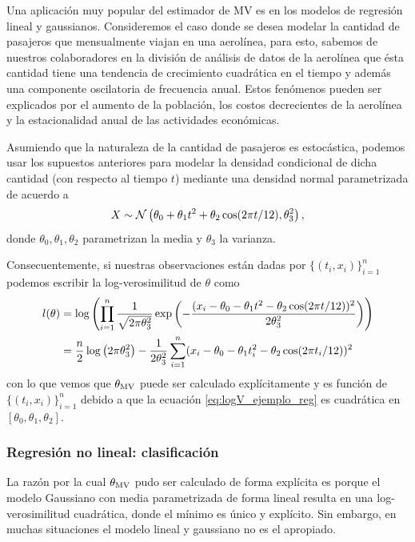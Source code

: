 Una aplicación muy popular del estimador de MV es en los modelos de regresión lineal y gaussianos. Consideremos el caso donde se desea modelar la cantidad de pasajeros que mensualmente viajan en una aerolínea, para esto, sabemos de nuestros colaboradores en la división de análisis de datos de la aerolínea que ésta cantidad tiene una tendencia de crecimiento cuadrática en el tiempo y además una componente oscilatoria de frecuencia anual. Estos fenómenos pueden ser explicados por el aumento de la población, los costos decrecientes de la aerolínea y la estacionalidad anual de las actividades económicas. 

Asumiendo que la naturaleza de la cantidad de pasajeros es estocástica, podemos usar los supuestos anteriores para modelar la densidad condicional  de dicha cantidad (con respecto al tiempo $t$) mediante una densidad normal parametrizada de acuerdo a 
\begin{equation}
	X \sim {\mathcal N}\left(\theta_0 + \theta_1 t^2 + \theta_2\cos(2\pi t/12), \theta_3^2\right),
\end{equation}
donde $\theta_0,\theta_1,\theta_2$ parametrizan la media y $\theta_3$ la varianza. 

Consecuentemente, si nuestras observaciones están dadas por $\{(t_i,x_i)\}_{i=1}^n$ podemos escribir la log-verosimilitud de $\theta$ como 
\begin{align}
	\label{eq:logV_ejemplo_reg}
	l(\theta) 	&=\log\left(\prod_{i=1}^n \frac{1}{\sqrt{2\pi\theta_3^2}}\exp\left(-\frac{(x_i-\theta_0 - \theta_1 t^2 - \theta_2\cos(2\pi t/12))^2}{2\theta_3^2}\right)\right)\nonumber \\
	&=\frac{n}{2}\log\left(2\pi\theta_3^2\right)  - \frac{1}{2\theta_3^2}\sum_{i=1}^n (x_i - \theta_0 - \theta_1 t_i^2 - \theta_2\cos(2\pi t_i/12))^2
\end{align}
con lo que vemos que ${\theta_\text{MV}}$ puede ser calculado explícitamente y es función de $\{(t_i,x_i)\}_{i=1}^n$ debido a que la ecuación \eqref{eq:logV_ejemplo_reg} es cuadrática en $[\theta_0,\theta_1,	\theta_2]$.



\subsubsection{Regresión no lineal: clasificación} 
\label{sub:clasif}

La razón por la cual ${\theta_\text{MV}}$ pudo ser calculado de forma explícita es porque el modelo Gaussiano con media parametrizada de forma lineal resulta en una log-verosimilitud cuadrática, donde el mínimo es único y explícito. Sin embargo, en muchas situaciones el modelo lineal y gaussiano no es el apropiado. 

